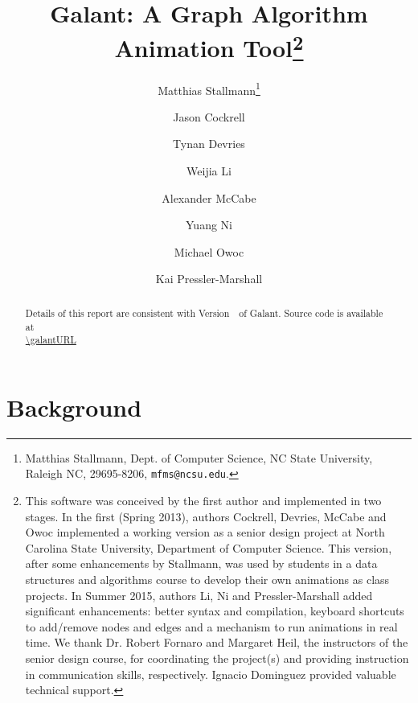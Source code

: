\documentclass{article}
\begin{document}
\title{Galant: A Graph Algorithm Animation Tool\thanks{
    This software was conceived by the first author and implemented in
    two stages.
    In the first (Spring 2013), authors Cockrell, Devries, McCabe and Owoc implemented a
    working version as
    a senior design project at North Carolina
    State University, Department of Computer Science.
    This version, after some enhancements by Stallmann,
    was used by students in a data structures and algorithms course to develop
    their own animations as class projects.
    In Summer 2015, authors Li, Ni and Pressler-Marshall
    added significant enhancements: better syntax and compilation, keyboard shortcuts to add/remove nodes and edges and a mechanism to run animations in real time.
    We thank Dr. Robert Fornaro and Margaret Heil, the instructors of the senior design course, for
    coordinating the project(s) and providing instruction in communication
    skills, respectively. Ignacio Dominguez provided valuable technical
    support.
  }
}
\author{Matthias Stallmann\thanks{Matthias Stallmann, Dept. of Computer
    Science, NC State University, Raleigh NC, 29695-8206,
    \texttt{mfms@ncsu.edu}.
  }
  \and Jason Cockrell
  \and Tynan Devries
  \and Weijia Li
  \and Alexander McCabe
  \and Yuang Ni
  \and Michael Owoc
  \and Kai Pressler-Marshall
}

\maketitle

\begin{abstract}



Details of this report are consistent with Version~\VERSION\ of Galant.
Source code is available at\\
\hspace*{2em}\url{\galantURL}

\end{abstract}

\newpage

\tableofcontents

\newpage

\listoffigures

\listoftables

\newpage

\section{Background}
\end{document}
